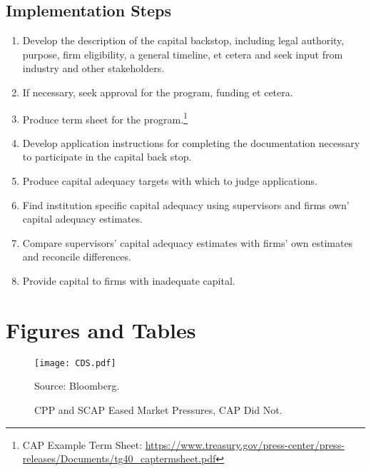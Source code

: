 \documentclass[12pt]{article}
\begin{document}
\subsection{Implementation Steps}

\begin{enumerate}

\item Develop the description of the capital backstop, including legal authority, purpose, firm eligibility, a general timeline, et cetera and seek input from industry and other stakeholders.
\item If necessary, seek approval for the program, funding et cetera.
\item Produce term sheet for the program.\footnote{CAP Example Term Sheet: \newline \url{https://www.treasury.gov/press-center/press-releases/Documents/tg40_captermsheet.pdf}}
\item Develop application instructions for completing the documentation necessary to participate in the capital back stop.
\item Produce capital adequacy targets with which to judge applications.
\item Find institution specific capital adequacy using supervisors and firms own' capital adequacy estimates. 
\item Compare supervisors' capital adequacy estimates with firms' own estimates and reconcile differences.
\item Provide capital to firms with inadequate capital. 

\end{enumerate}

\newpage
\section{Figures and Tables}

\begin{figure}[h]
\caption{CPP and SCAP Eased Market Pressures, CAP Did Not.}\label{figure1}
\centering
\texttt{[image: CDS.pdf]}
\raggedright
\footnotesize Source: Bloomberg.
\end{figure}
\end{document}
